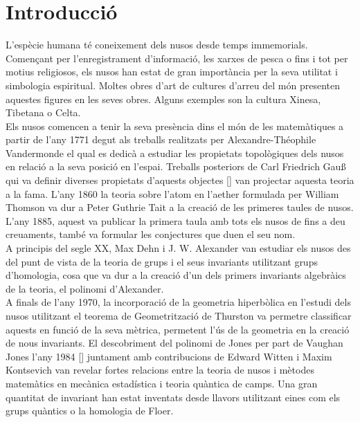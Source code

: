 \renewcommand{\figurename}{Figura}
\renewcommand{\proofname}{Demostració}
\newtheorem{definition}{Definició}
\newtheorem{theorem}{Teorema}
\newtheorem{proposition}{Proposició}
\newtheorem{corolary}{Corol·lari}
\newtheorem{lemma}{Lema}

\section{Introducció}\label{sec:Introducció}
L'espècie humana té coneixement dels nusos desde temps immemorials. Començant per l'enregistrament d'informació, les xarxes de pesca o fins i tot per motius religiosos, els nusos han estat de gran importància per la seva utilitat i simbologia espiritual. Moltes obres d'art de cultures d'arreu del món presenten aquestes figures en les seves obres. Alguns exemples son la cultura Xinesa, Tibetana o Celta.\\

Els nusos comencen a tenir la seva presència dins el món de les matemàtiques a partir de l'any 1771 degut als treballs realitzats per Alexandre-Théophile Vandermonde el qual es dedicà a estudiar les propietats topològiques dels nusos en relació a la seva posició en l'espai. Treballs posteriors de Carl Friedrich Gau\ss$ $ qui va definir diverses propietats d'aquests objectes [\cite{knottheory}] van projectar aquesta teoria a la fama. L'any 1860 la teoria sobre l'atom en l'aether formulada per William Thomson va dur a Peter Guthrie Tait a la creació de les primeres taules de nusos. L'any 1885, aquest va publicar la primera taula amb tots els nusos de fins a deu creuaments, també va formular les conjectures que duen el seu nom.\\

A principis del segle XX, Max Dehn i J. W. Alexander van estudiar els nusos des del punt de vista de la teoria de grups i el seus invariants utilitzant grups d'homologia, cosa que va dur a la creació d'un dels primers invariants algebràics de la teoria, el polinomi d'Alexander.\\

A finals de l'any 1970, la incorporació de la geometria hiperbòlica en l'estudi dels nusos utilitzant el teorema de Geometrització de Thurston va permetre classificar aquests en funció de la seva mètrica, permetent l'ús de la geometria en la creació de nous invariants. El descobriment del polinomi de Jones per part de Vaughan Jones l'any 1984 [\cite{mathwithatwist}] juntament amb contribucions de Edward Witten i Maxim Kontsevich van revelar fortes relacions entre la teoria de nusos i mètodes matemàtics en mecànica estadística i teoria quàntica de camps. Una gran quantitat de invariant han estat inventats desde llavors utilitzant eines com els grups quàntics o la homologia de Floer.\\

